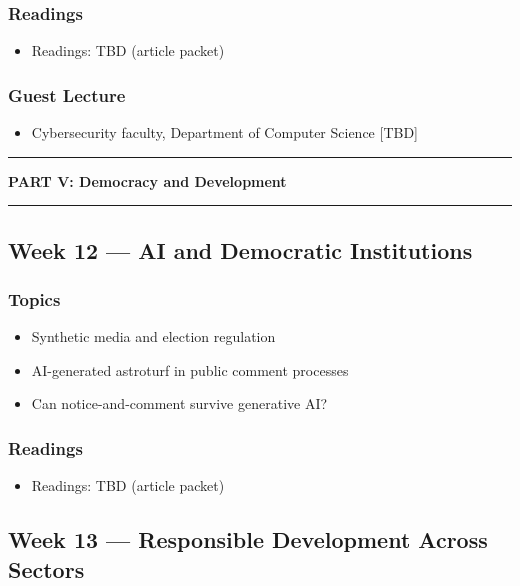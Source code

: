 \documentclass[12pt]{article}
\begin{document}
    \subsubsection*{Readings}
        \begin{itemize}
            \item Readings: TBD (article packet)
        \end{itemize}
    \subsubsection*{Guest Lecture}
        \begin{itemize}
            \item Cybersecurity faculty, Department of Computer Science [TBD]
        \end{itemize}

\bigskip
\noindent\rule{\textwidth}{0.6pt}
\begin{center}\textbf{PART V: Democracy and Development}\end{center}
\noindent\rule{\textwidth}{0.6pt}

\subsection*{Week 12 --- AI and Democratic Institutions}
    \subsubsection*{Topics}
        \begin{itemize}
            \item Synthetic media and election regulation
            \item AI-generated astroturf in public comment processes
            \item Can notice-and-comment survive generative AI?
        \end{itemize}
    \subsubsection*{Readings}
        \begin{itemize}
            \item Readings: TBD (article packet)
        \end{itemize}

\subsection*{Week 13 --- Responsible Development Across Sectors}
\end{document}
